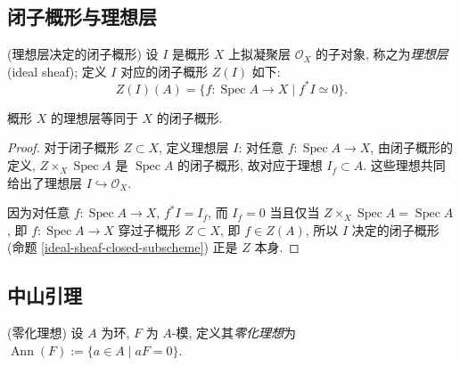 \documentclass{book}
\begin{document}
	\subsection{闭子概形与理想层}
	
	\begin{definition}
		[label={ideal-sheaf-closed-subscheme}]
		{(理想层决定的闭子概形)}
		设 $I$ 是概形 $X$ 上拟凝聚层 $\mathcal O_X$ 的子对象, 称之为\emph{理想层} (ideal sheaf); 定义 $I$ 对应的闭子概形 $Z(I)$ 如下:
		$$
		Z(I)(A) = \{f\colon \operatorname{Spec} A\to X \mid f^*I \simeq 0\}.
		$$
	\end{definition}
	
	\begin{prop}
		{}
		概形 $X$ 的理想层等同于 $X$ 的闭子概形.
	\end{prop}
	\begin{proof}
		对于闭子概形 $Z\subset X$, 定义理想层 $I$: 对任意 $f\colon \operatorname{Spec} A\to X$, 由闭子概形的定义, $Z\times_X\operatorname{Spec} A$ 是 $\operatorname{Spec} A$ 的闭子概形, 故对应于理想 $I_f\subset A$. 这些理想共同给出了理想层 $I\hookrightarrow \mathcal O_X$.
		
		因为对任意 $f\colon \operatorname{Spec} A\to X$, $f^*I=I_f$, 而 $I_f=0$ 当且仅当 $Z\times_X \operatorname{Spec} A=\operatorname{Spec} A$, 即 $f\colon \operatorname{Spec} A\to X$ 穿过子概形 $Z\subset X$, 即 $f\in Z(A)$, 所以 $I$ 决定的闭子概形 (命题 \ref{ideal-sheaf-closed-subscheme}) 正是 $Z$ 本身.
	\end{proof}
	
	\subsection{中山引理}
	
	\begin{definition}
		{(零化理想)}
		设 $A$ 为环, $F$ 为 $A$-模, 定义其\emph{零化理想}为
		$\operatorname{Ann}(F) := \{a\in A \mid a F=0\}$.
	\end{definition}
	
\end{document}
